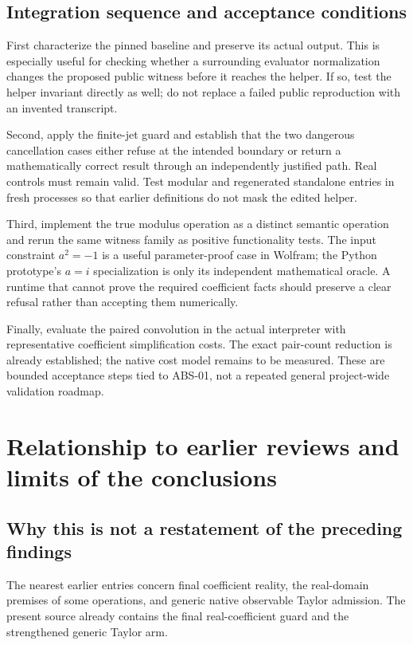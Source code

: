 \documentclass[11pt]{article}
\theoremstyle{remark}\newtheorem{remark}[theorem]{Remark}
\begin{document}
\subsection{Integration sequence and acceptance conditions}
First characterize the pinned baseline and preserve its actual output. This
is especially useful for checking whether a surrounding evaluator normalization
changes the proposed public witness before it reaches the helper. If so, test
the helper invariant directly as well; do not replace a failed public
reproduction with an invented transcript.

Second, apply the finite-jet guard and establish that the two dangerous
cancellation cases either refuse at the intended boundary or return a
mathematically correct result through an independently justified path. Real
controls must remain valid. Test modular and regenerated standalone entries
in fresh processes so that earlier definitions do not mask the edited helper.

Third, implement the true modulus operation as a distinct semantic operation
and rerun the same witness family as positive functionality tests. The input
constraint \(a^2=-1\) is a useful parameter-proof case in Wolfram; the Python
prototype's \(a=i\) specialization is only its independent mathematical oracle.
A runtime that cannot prove the required coefficient facts should preserve a
clear refusal rather than accepting them numerically.

Finally, evaluate the paired convolution in the actual interpreter with
representative coefficient simplification costs. The exact pair-count reduction
is already established; the native cost model remains to be measured.
These are bounded acceptance steps tied to ABS-01, not a repeated general
project-wide validation roadmap.

\section{Relationship to earlier reviews and limits of the conclusions}
\subsection{Why this is not a restatement of the preceding findings}
The nearest earlier entries concern final coefficient reality, the real-domain
premises of some operations, and generic native observable Taylor admission.
The present source already contains the final real-coefficient guard and the
strengthened generic Taylor arm.\cite{status,wave3,operations}
\end{document}
